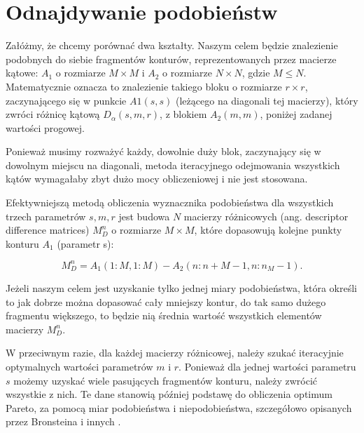 \section{Odnajdywanie podobieństw}

Załóżmy, że chcemy porównać dwa kształty. Naszym celem będzie znalezienie
podobnych do siebie fragmentów konturów, reprezentowanych przez macierze
kątowe: $A_{1}$ o rozmiarze $M \times M$ i $A_{2}$ o rozmiarze $N \times N$,
gdzie $M \leq N$.  Matematycznie oznacza to znalezienie takiego bloku o
rozmiarze $r \times r$, zaczynającego się w punkcie $A1(s,s)$ (leżącego na
diagonali tej macierzy), który zwróci różnicę kątową $D_{\alpha}(s,m,r)$, z
blokiem $A_{2}(m,m)$, poniżej zadanej wartości progowej. 


Ponieważ musimy rozważyć każdy, dowolnie duży blok, zaczynający się w dowolnym
miejscu na diagonali, metoda iteracyjnego odejmowania wszystkich kątów
wymagałaby zbyt dużo mocy obliczeniowej i nie jest stosowana.

Efektywniejszą metodą obliczenia wyznacznika podobieństwa dla wszystkich trzech
parametrów $s,m,r$ jest budowa $N$ macierzy różnicowych (ang. descriptor
difference matrices) $M_{D}^{n}$ o rozmiarze $M \times M$, które dopasowują
kolejne punkty konturu $A_{1}$ (parametr s):

\begin{equation}
  M_{D}^{n} = A_{1}(1: M, 1: M) - A_{2}(n: n+M-1, n:n_M-1).
\end{equation}

Jeżeli naszym celem jest uzyskanie tylko jednej miary podobieństwa, która
określi to jak dobrze można dopasować cały mniejszy kontur, do tak samo dużego
fragmentu większego, to będzie nią średnia wartość wszystkich elementów
macierzy $M_{D}^{n}$.

W przeciwnym razie, dla każdej macierzy różnicowej, należy szukać iteracyjnie
optymalnych wartości parametrów $m$ i $r$. Ponieważ dla jednej wartości
parametru $s$ możemy uzyskać wiele pasujących fragmentów konturu, należy
zwrócić wszystkie z nich. Te dane stanowią później podstawę do obliczenia
optimum Pareto, za pomocą miar podobieństwa i niepodobieństwa, szczegółowo
opisanych przez Bronsteina i innych \cite{partial_similarity}.


